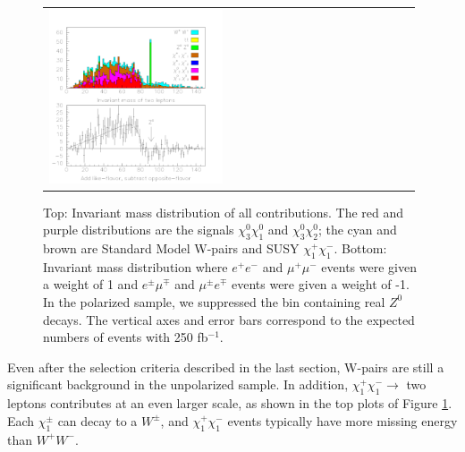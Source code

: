 \documentclass[12pt]{article}
\begin{document}
\begin{figure}[t]
\begin{center}
\begin{tabular}{p{0.49\linewidth} p{0.49\linewidth}}
      \begin{minipage}{\linewidth} \vspace{-1.2 cm} \includegraphics[width=\linewidth]{../pretty_plots/two_leptons_fixed_2_pol.pdf} \end{minipage}
    \end{tabular}

    \caption{Top: Invariant mass distribution of all contributions.
    The red and purple distributions are the signals
    $\chi_3^0\chi_1^0$ and $\chi_3^0\chi_2^0$; the cyan and brown are
    Standard Model W-pairs and SUSY $\chi_1^+\chi_1^-$.  Bottom:
    Invariant mass distribution where $e^+e^-$ and $\mu^+\mu^-$ events
    were given a weight of 1 and $e^\pm\mu^\mp$ and $\mu^\pm e^\mp$
    events were given a weight of -1.  In the polarized sample, we
    suppressed the bin containing real $Z^0$ decays.  The vertical
    axes and error bars correspond to the expected numbers of events
    with 250 fb$^{-1}$.}

    \label{jimpsubtraction}
  \end{center}
\end{figure}

Even after the selection criteria described in the last section,
W-pairs are still a significant background in the unpolarized sample.
In addition, $\chi_1^+\chi_1^- \to$ two leptons contributes at an even
larger scale, as shown in the top plots of Figure
\ref{jimpsubtraction}.  Each $\chi_1^\pm$ can decay to a $W^\pm$, and
$\chi_1^+\chi_1^-$ events typically have more missing energy than
$W^+W^-$.
\end{document}

